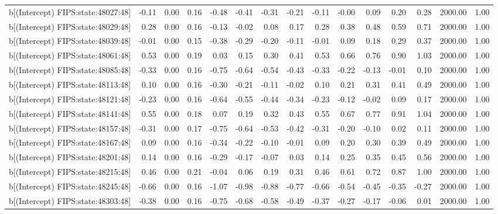 \begin{table}[ht]
\begin{tabular}{rrrrrrrrrrrrrrr}
  b[(Intercept) FIPS:state:48027:48] & -0.11 & 0.00 & 0.16 & -0.48 & -0.41 & -0.31 & -0.21 & -0.11 & -0.00 & 0.09 & 0.20 & 0.28 & 2000.00 & 1.00 \\ 
  b[(Intercept) FIPS:state:48029:48] & 0.28 & 0.00 & 0.16 & -0.13 & -0.02 & 0.08 & 0.17 & 0.28 & 0.38 & 0.48 & 0.59 & 0.71 & 2000.00 & 1.00 \\ 
  b[(Intercept) FIPS:state:48039:48] & -0.01 & 0.00 & 0.15 & -0.38 & -0.29 & -0.20 & -0.11 & -0.01 & 0.09 & 0.18 & 0.29 & 0.37 & 2000.00 & 1.00 \\ 
  b[(Intercept) FIPS:state:48061:48] & 0.53 & 0.00 & 0.19 & 0.03 & 0.15 & 0.30 & 0.41 & 0.53 & 0.66 & 0.76 & 0.90 & 1.03 & 2000.00 & 1.00 \\ 
  b[(Intercept) FIPS:state:48085:48] & -0.33 & 0.00 & 0.16 & -0.75 & -0.64 & -0.54 & -0.43 & -0.33 & -0.22 & -0.13 & -0.01 & 0.10 & 2000.00 & 1.00 \\ 
  b[(Intercept) FIPS:state:48113:48] & 0.10 & 0.00 & 0.16 & -0.30 & -0.21 & -0.11 & -0.02 & 0.10 & 0.21 & 0.31 & 0.41 & 0.49 & 2000.00 & 1.00 \\ 
  b[(Intercept) FIPS:state:48121:48] & -0.23 & 0.00 & 0.16 & -0.64 & -0.55 & -0.44 & -0.34 & -0.23 & -0.12 & -0.02 & 0.09 & 0.17 & 2000.00 & 1.00 \\ 
  b[(Intercept) FIPS:state:48141:48] & 0.55 & 0.00 & 0.18 & 0.07 & 0.19 & 0.32 & 0.43 & 0.55 & 0.67 & 0.77 & 0.91 & 1.04 & 2000.00 & 1.00 \\ 
  b[(Intercept) FIPS:state:48157:48] & -0.31 & 0.00 & 0.17 & -0.75 & -0.64 & -0.53 & -0.42 & -0.31 & -0.20 & -0.10 & 0.02 & 0.11 & 2000.00 & 1.00 \\ 
  b[(Intercept) FIPS:state:48167:48] & 0.09 & 0.00 & 0.16 & -0.34 & -0.22 & -0.10 & -0.01 & 0.09 & 0.20 & 0.30 & 0.39 & 0.49 & 2000.00 & 1.00 \\ 
  b[(Intercept) FIPS:state:48201:48] & 0.14 & 0.00 & 0.16 & -0.29 & -0.17 & -0.07 & 0.03 & 0.14 & 0.25 & 0.35 & 0.45 & 0.56 & 2000.00 & 1.00 \\ 
  b[(Intercept) FIPS:state:48215:48] & 0.46 & 0.00 & 0.21 & -0.04 & 0.06 & 0.19 & 0.31 & 0.46 & 0.61 & 0.72 & 0.87 & 1.00 & 2000.00 & 1.00 \\ 
  b[(Intercept) FIPS:state:48245:48] & -0.66 & 0.00 & 0.16 & -1.07 & -0.98 & -0.88 & -0.77 & -0.66 & -0.54 & -0.45 & -0.35 & -0.27 & 2000.00 & 1.00 \\ 
  b[(Intercept) FIPS:state:48303:48] & -0.38 & 0.00 & 0.16 & -0.75 & -0.68 & -0.58 & -0.49 & -0.37 & -0.27 & -0.17 & -0.06 & 0.01 & 2000.00 & 1.00 \\ 

\end{tabular}
\end{table}
